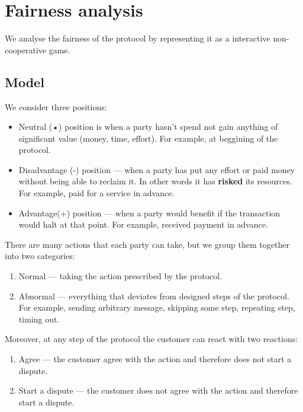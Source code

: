 \documentclass{ieeeaccess}
\begin{document}
\section{Fairness analysis}
We analyse the fairness of the protocol by representing it as a
interactive non-cooperative game.

\subsection{Model}\label{model}

We consider three positions:

\begin{itemize}
\item
  Neutral (•) position is when a party hasn't spend not gain anything of
  significant value (money, time, effort). For example, at beggining of
  the protocol.
\item
  Disadvantage (-) position — when a party has put any effort or paid
  money without being able to reclaim it. In other words it has
  \textbf{risked} its resources. For example, paid for a service in
  advance.
\item
  Advantage(+) position — when a party would benefit if the
  transaction would halt at that point. For example, received payment in
  advance.
\end{itemize}

There are many actions that each party can take, but we group them
together into two categories:

\begin{enumerate}
\def\labelenumi{\arabic{enumi}.}

\item
  Normal --- taking the action prescribed by the protocol.
\item
  Abnormal --- everything that deviates from designed steps of the
  protocol. For example, sending arbitrary message, skipping some step,
  repeating step, timing out.
\end{enumerate}

Moreover, at any step of the protocol the customer can react with two
reactions:

\begin{enumerate}
\def\labelenumi{\arabic{enumi}.}

\item
  Agree --- the customer agree with the action and therefore does not
  start a dispute.
\item
  Start a dispute --- the customer does not agree with the action and
  therefore start a dispute.
\end{enumerate}
\end{document}
